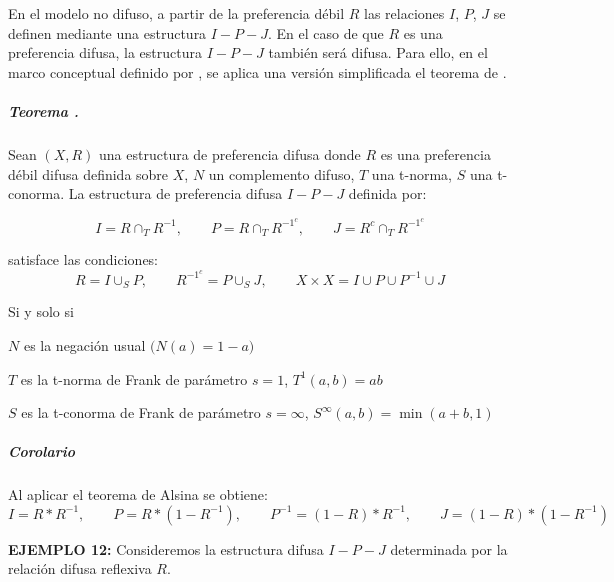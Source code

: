 \documentclass[a5paper,doc,10pt,noapacite]{apa6}
\begin{document}
{{En el modelo no difuso, a partir de la preferencia débil \(R\) las relaciones \(I\), \(P\), \(J\) se definen mediante una estructura \(I-P-J\). En el caso de que \(R\) es una preferencia difusa, la estructura \(I-P-J\) también será difusa. Para ello, en el marco conceptual definido por , se aplica una versión simplificada el teorema de .

\subparagraph{Teorema \cite{Alsina-1985}.}

Sean \((X,R)\) una estructura de preferencia difusa donde \(R\) es una preferencia débil difusa definida sobre \(X\), \(N\) un complemento difuso, \(T\) una t-norma, \(S\) una t-conorma. La estructura de preferencia difusa \(I-P-J\) definida por:

\[
	I = R \cap_T R^{-1}, \qquad P = R \cap_T R^{{-1}^c}, \qquad J = R^{c} \cap_T R^{{-1}^c}
\]

satisface las condiciones:
\[
	R = I \cup_S P, \qquad R^{{-1}^c} = P \cup_S J, \qquad X \times X = I \cup P \cup P^{-1} \cup J 
\]

Si y solo si

\begin{APAitemize}
    \item \(N\) es la negación usual \(\big(N(a) = 1-a\big)\)
    \item \(T\) es la t-norma de Frank de parámetro \(s = 1\), \(T^1(a,b) = ab\)
    \item \(S\) es la t-conorma de Frank de parámetro \(s = \infty\), \(S^{\infty}(a,b) = \min(a+b, 1)\)
\end{APAitemize}

\subparagraph{Corolario}

Al aplicar el teorema de Alsina se obtiene:
\[
	I = R*R^{-1}, \qquad P = R*(1-R^{-1}), \qquad P^{-1} = (1-R)*R^{-1}, \qquad J = (1-R)*(1-R^{-1})
\]

\vspace{1\baselineskip}
\textbf{EJEMPLO 12:} Consideremos la estructura difusa \(I-P-J\) determinada por la relación difusa reflexiva \(R\).

}}
\end{document}
